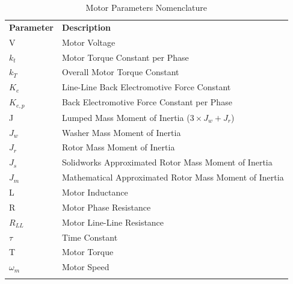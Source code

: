 \begin{table}[ht]
\begin{center}
\caption{Motor Parameters Nomenclature}
\begin{tabular}[c]{ l l }

\textbf{Parameter} & \textbf{Description}\\
\Xhline{2\arrayrulewidth}

\rowcolor{gray!20}
V & Motor Voltage\\


\(k_t\) & Motor Torque Constant per Phase\\

\rowcolor{gray!20}
\(k_T\) & Overall Motor Torque Constant\\


\(K_e\) & Line-Line Back Electromotive Force Constant\\

\rowcolor{gray!20}
\(K_{e,p}\) & Back Electromotive Force Constant per Phase\\


J & Lumped Mass Moment of Inertia ($3 \times J_w + J_r$)\\

\rowcolor{gray!20}
$J_w$ & Washer Mass Moment of Inertia\\


$J_r$ & Rotor Mass Moment of Inertia\\

\rowcolor{gray!20}
$J_s$ & Solidworks Approximated Rotor Mass Moment of Inertia\\


$J_m$ & Mathematical Approximated Rotor Mass Moment of Inertia\\

\rowcolor{gray!20}
L & Motor Inductance\\


R & Motor Phase Resistance\\

\rowcolor{gray!20}
\(R_{LL}\) & Motor Line-Line Resistance\\


\(\tau\) & Time Constant\\

\rowcolor{gray!20}
T & Motor Torque\\


\(\omega_m\) & Motor Speed\\

\Xhline{2\arrayrulewidth}
\end{tabular}

\label{table2}
\end{center}
\end{table}

